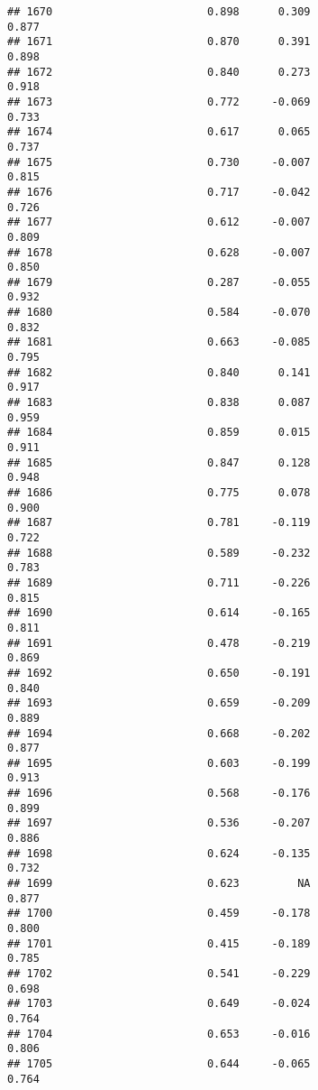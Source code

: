 \documentclass[
]{article}
\begin{document}
\begin{verbatim}
## 1670                        0.898      0.309                     0.877
## 1671                        0.870      0.391                     0.898
## 1672                        0.840      0.273                     0.918
## 1673                        0.772     -0.069                     0.733
## 1674                        0.617      0.065                     0.737
## 1675                        0.730     -0.007                     0.815
## 1676                        0.717     -0.042                     0.726
## 1677                        0.612     -0.007                     0.809
## 1678                        0.628     -0.007                     0.850
## 1679                        0.287     -0.055                     0.932
## 1680                        0.584     -0.070                     0.832
## 1681                        0.663     -0.085                     0.795
## 1682                        0.840      0.141                     0.917
## 1683                        0.838      0.087                     0.959
## 1684                        0.859      0.015                     0.911
## 1685                        0.847      0.128                     0.948
## 1686                        0.775      0.078                     0.900
## 1687                        0.781     -0.119                     0.722
## 1688                        0.589     -0.232                     0.783
## 1689                        0.711     -0.226                     0.815
## 1690                        0.614     -0.165                     0.811
## 1691                        0.478     -0.219                     0.869
## 1692                        0.650     -0.191                     0.840
## 1693                        0.659     -0.209                     0.889
## 1694                        0.668     -0.202                     0.877
## 1695                        0.603     -0.199                     0.913
## 1696                        0.568     -0.176                     0.899
## 1697                        0.536     -0.207                     0.886
## 1698                        0.624     -0.135                     0.732
## 1699                        0.623         NA                     0.877
## 1700                        0.459     -0.178                     0.800
## 1701                        0.415     -0.189                     0.785
## 1702                        0.541     -0.229                     0.698
## 1703                        0.649     -0.024                     0.764
## 1704                        0.653     -0.016                     0.806
## 1705                        0.644     -0.065                     0.764

\end{verbatim}
\end{document}
